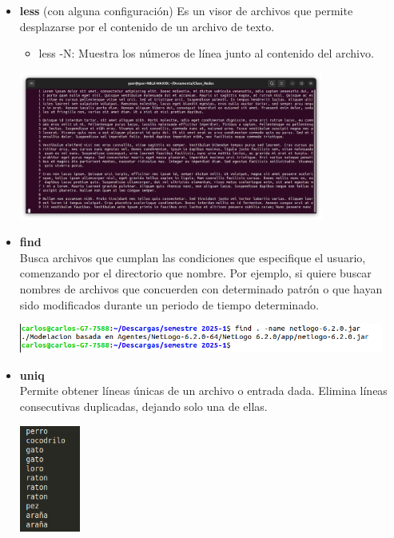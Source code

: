 \begin{itemize}
    \item \textbf{less} (con alguna configuración)
    Es un visor de archivos que permite desplazarse por el contenido de un archivo de texto.\\
    \begin{itemize}
        \item less -N:  Muestra los números de línea junto al contenido del archivo.\\
    \end{itemize}
    \begin{center}
        \includegraphics[width=10cm]{IMAGE/comandos/less-example.png}\\
    \end{center}
    \item \textbf{find}\\
    Busca archivos que cumplan las condiciones que especifique el usuario, comenzando por el directorio que nombre. Por ejemplo, si quiere buscar nombres de archivos que concuerden con determinado patrón o que hayan sido modificados durante un periodo de tiempo determinado.\\
    \begin{center}
        \includegraphics[width=12cm]{IMAGE/find.png}
    \end{center}
    
    \item \textbf{uniq}\\
    Permite obtener líneas únicas de un archivo o entrada dada. Elimina líneas consecutivas duplicadas, dejando solo una de ellas.
    \begin{center}
        \includegraphics[width=2cm]{IMAGE/lista.png}
    \end{center}
    

\end{itemize}
